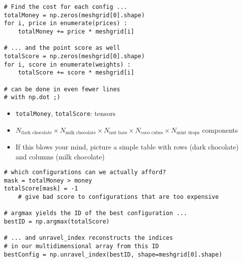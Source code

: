 \begin{frame}[fragile]
%
\begin{tcbraster}[raster columns=2,
                  raster equal height,
                  nobeforeafter,
                  raster column skip=0.2cm]
\begin{codebox}
\begin{verbatim}
# Find the cost for each config ...
totalMoney = np.zeros(meshgrid[0].shape)
for i, price in enumerate(prices) :
    totalMoney += price * meshgrid[i]

# ... and the point score as well
totalScore = np.zeros(meshgrid[0].shape)
for i, score in enumerate(weights) :
    totalScore += score * meshgrid[i]

# can be done in even fewer lines
# with np.dot ;)
\end{verbatim}
\end{codebox}
%
\begin{tcolorbox}[title=Elements in Code]
\begin{itemize}
\item \texttt{totalMoney}, \texttt{totalScore}: tensors
\item $N_{\text{dark chocolate}} \times N_{\text{milk chocolate}} \times N_{\text{nut bars}} \times N_{\text{coco cubes}} \times N_{\text{mint drops}}$ components
\item If this blows your mind, picture a simple table with rows (dark chocolate) and columns (milk chocolate)
\end{itemize}
\end{tcolorbox}
\end{tcbraster}
%
\end{frame}


\begin{frame}[fragile]
%
\begin{codebox}
\begin{verbatim}
# which configurations can we actually afford?
mask = totalMoney > money
totalScore[mask] = -1
    # give bad score to configurations that are too expensive

# argmax yields the ID of the best configuration ...
bestID = np.argmax(totalScore)

# ... and unravel_index reconstructs the indices
# in our multidimensional array from this ID
bestConfig = np.unravel_index(bestID, shape=meshgrid[0].shape)
\end{verbatim}
\end{codebox}
%
\end{frame}

